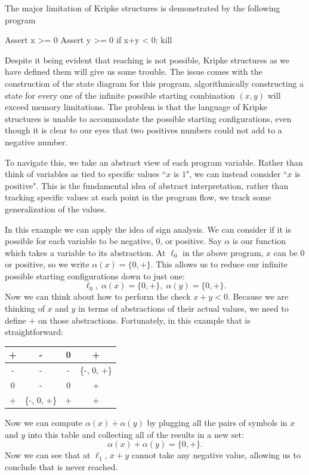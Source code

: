 The major limitation of Kripke structures is demonstrated by the following program
\begin{code}
Assert x >= 0
Assert y >= 0
if x+y < 0:
  kill
\end{code}
Despite it being evident that reaching \kil is not possible, Kripke structures as we have defined them will give us some trouble.
The issue comes with the construction of the state diagram for this program, algorithmically constructing a state for every one of the infinite possible starting combination $(x, y)$ will exceed memory limitations.
The problem is that the language of Kripke structures is unable to accommodate the possible starting configurations, even though it is clear to our eyes that two positives numbers could not add to a negative number. 

To navigate this, we take an abstract view of each program variable. 
Rather than think of variables as tied to specific values ``$x$ is $1$", we can instead consider ``$x$ is positive".
This is the fundamental idea of abstract interpretation, rather than tracking specific values at each point in the program flow, we track some generalization of the values.

In this example we can apply the idea of sign analysis.
We can consider if it is possible for each variable to be negative, $0$, or positive.
Say $\alpha$ is our function which takes a variable to its abstraction.
At $\ell_0$ in the above program, $x$ can be $0$ or positive, so we write $\alpha(x) = \{0, +\}$.
This allows us to reduce our infinite possible starting configurations down to just one: 
\[
 \ell_0, \; \alpha(x) = \{0, +\},\; \alpha(y) = \{0, +\}.
\]
Now we can think about how to perform the check $x + y < 0$.
Because we are thinking of $x$ and $y$ in terms of abstractions of their actual values, we need to define $+$ on those abstractions.
Fortunately, in this example that is straightforward:
\begin{center}
  \begin{tabular} {c | c c c}
 +&-&0&+\\ \hline
 -&-&-&\{-, 0, +\} \\
 0&-&0&+\\
 +&\{-, 0, +\} & + &+
\end{tabular}
\end{center} 
Now we can compute $\alpha(x) + \alpha(y)$ by plugging all the pairs of symbols in $x$ and $y$ into this table and collecting all of the results in a new set:
\[\alpha(x) + \alpha(y) = \{0, +\}.\]
Now we can see that at $\ell_1$, $x + y$ cannot take any negative value, allowing us to conclude that \kil is never reached.


